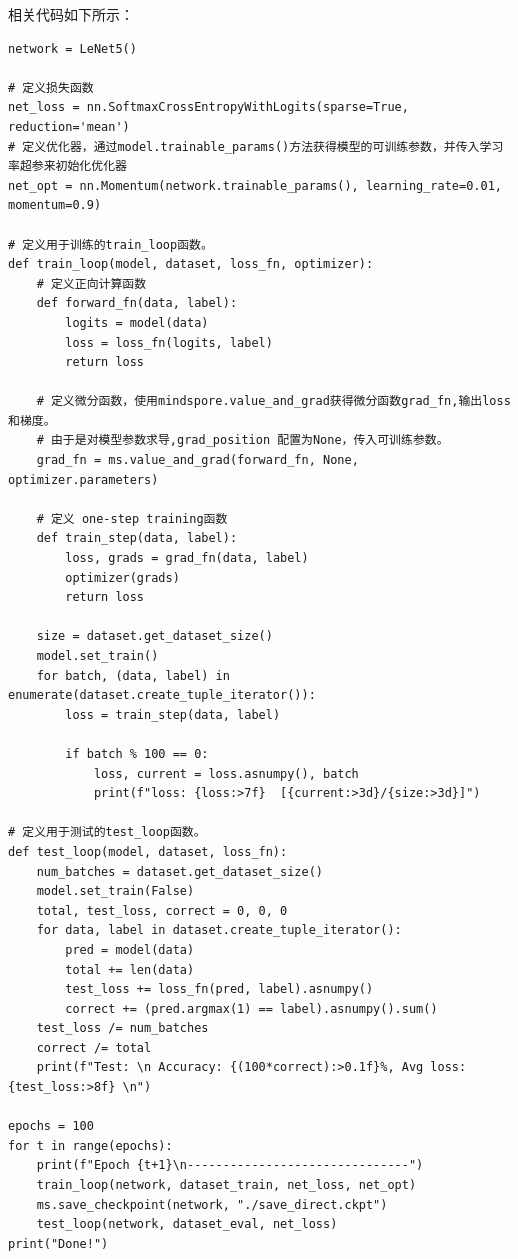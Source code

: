 \documentclass[12pt]{article}
\begin{document}
相关代码如下所示：
\begin{lstlisting}
network = LeNet5()

# 定义损失函数
net_loss = nn.SoftmaxCrossEntropyWithLogits(sparse=True, reduction='mean')
# 定义优化器，通过model.trainable_params()方法获得模型的可训练参数，并传入学习率超参来初始化优化器
net_opt = nn.Momentum(network.trainable_params(), learning_rate=0.01, momentum=0.9)

# 定义用于训练的train_loop函数。
def train_loop(model, dataset, loss_fn, optimizer):
    # 定义正向计算函数
    def forward_fn(data, label):
        logits = model(data)
        loss = loss_fn(logits, label)
        return loss

    # 定义微分函数，使用mindspore.value_and_grad获得微分函数grad_fn,输出loss和梯度。
    # 由于是对模型参数求导,grad_position 配置为None，传入可训练参数。
    grad_fn = ms.value_and_grad(forward_fn, None, optimizer.parameters)

    # 定义 one-step training函数
    def train_step(data, label):
        loss, grads = grad_fn(data, label)
        optimizer(grads)
        return loss

    size = dataset.get_dataset_size()
    model.set_train()
    for batch, (data, label) in enumerate(dataset.create_tuple_iterator()):
        loss = train_step(data, label)

        if batch % 100 == 0:
            loss, current = loss.asnumpy(), batch
            print(f"loss: {loss:>7f}  [{current:>3d}/{size:>3d}]")

# 定义用于测试的test_loop函数。
def test_loop(model, dataset, loss_fn):
    num_batches = dataset.get_dataset_size()
    model.set_train(False)
    total, test_loss, correct = 0, 0, 0
    for data, label in dataset.create_tuple_iterator():
        pred = model(data)
        total += len(data)
        test_loss += loss_fn(pred, label).asnumpy()
        correct += (pred.argmax(1) == label).asnumpy().sum()
    test_loss /= num_batches
    correct /= total
    print(f"Test: \n Accuracy: {(100*correct):>0.1f}%, Avg loss: {test_loss:>8f} \n")

epochs = 100
for t in range(epochs):
    print(f"Epoch {t+1}\n-------------------------------")
    train_loop(network, dataset_train, net_loss, net_opt)
    ms.save_checkpoint(network, "./save_direct.ckpt")
    test_loop(network, dataset_eval, net_loss)
print("Done!")
\end{lstlisting}
\end{document}
